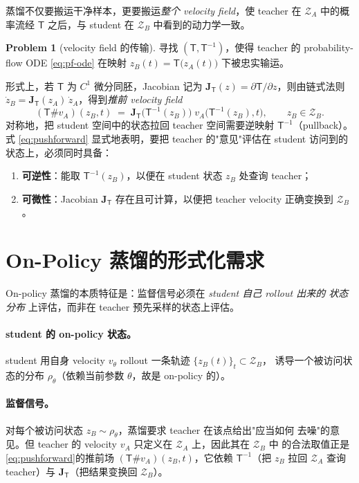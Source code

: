 \documentclass[11pt,a4paper]{article}
\newcommand{\Za}{\mathcal{Z}_{A}}
\newcommand{\Zb}{\mathcal{Z}_{B}}
\newcommand{\Tmap}{\mathsf{T}}
\newcommand{\Tinv}{\mathsf{T}^{-1}}
\newcommand{\push}{\#}
\newcommand{\Jac}{\mathbf{J}}
\theoremstyle{definition}
\newtheorem{problem}{Problem}
\begin{document}
蒸馏不仅要搬运干净样本，更要搬运\emph{整个 velocity field}，使 teacher 在
$\Za$ 中的概率流经 $\Tmap$ 之后，与 student 在 $\Zb$ 中看到的动力学一致。

\begin{problem}[velocity field 的传输]
\label{prob:pf-existence}
寻找 $(\Tmap,\Tinv)$，使得 teacher 的 probability-flow ODE
\eqref{eq:pf-ode} 在映射 $z_B(t)=\Tmap\big(z_A(t)\big)$ 下被忠实输运。
\end{problem}

形式上，若 $\Tmap$ 为 $C^1$ 微分同胚，Jacobian 记为
$\Jac_{\Tmap}(z)=\partial\Tmap/\partial z$，则由链式法则
$\dot z_B=\Jac_{\Tmap}(z_A)\,\dot z_A$，得到\emph{推前 velocity field}
\begin{equation}
(\Tmap\push v_A)(z_B,t)
\;=\;
\Jac_{\Tmap}\!\big(\Tinv(z_B)\big)\;
v_A\!\big(\Tinv(z_B),t\big),
\qquad z_B\in\Zb.
\label{eq:pushforward}
\end{equation}
对称地，把 student 空间中的状态拉回 teacher 空间需要逆映射 $\Tinv$（pullback）。
式 \eqref{eq:pushforward} 显式地表明，要把 teacher 的"意见"评估在 student
访问到的状态上，必须同时具备：
\begin{enumerate}[leftmargin=2em,itemsep=2pt]
  \item \textbf{可逆性}：能取 $\Tinv(z_B)$，以便在 student 状态 $z_B$ 处查询
        teacher；
  \item \textbf{可微性}：Jacobian $\Jac_{\Tmap}$ 存在且可计算，以便把 teacher
        velocity 正确变换到 $\Zb$。
\end{enumerate}

\section{On-Policy 蒸馏的形式化需求}
\label{sec:onpolicy}

On-policy 蒸馏的本质特征是：监督信号必须在 \emph{student 自己 rollout 出来的
状态分布} 上评估，而非在 teacher 预先采样的状态上评估。

\paragraph{student 的 on-policy 状态。}
student 用自身 velocity $v_\theta$ rollout 一条轨迹 $\{z_B(t)\}_{t}\subset\Zb$，
诱导一个被访问状态的分布 $\rho_\theta$（依赖当前参数 $\theta$，故是 on-policy 的）。

\paragraph{监督信号。}
对每个被访问状态 $z_B\sim\rho_\theta$，蒸馏要求 teacher 在该点给出"应当如何
去噪"的意见。但 teacher 的 velocity $v_A$ 只定义在 $\Za$ 上，因此其在 $\Zb$ 中
的合法取值正是\eqref{eq:pushforward}的推前场 $(\Tmap\push v_A)(z_B,t)$，它依赖
$\Tinv$（把 $z_B$ 拉回 $\Za$ 查询 teacher）与 $\Jac_{\Tmap}$（把结果变换回 $\Zb$）。
\end{document}
